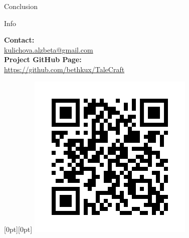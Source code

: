 \documentclass[portrait,a0paper,fontscale=0.35]{baposter}
\begin{document}
\begin{poster}
\begin{posterbox}[column=1, name=conclusion, below=result2, headerColorOne=yellow!80!orange!95!black, boxColorOne=yellow!33]{Conclusion}
\end{posterbox}


\begin{posterbox}[column=1, name=info, below=conclusion]{Info}

 


\vspace{5mm}
    \textbf{Contact:} \\
    \href{mailto:kulichova.alzbeta@gmail.com}{kulichova.alzbeta@gmail.com} \\[1ex]
    \textbf{Project GitHub Page:} \\
    \href{https://github.com/bethkux/TaleCraft}{https://github.com/bethkux/TaleCraft}\\
    



\begin{flushright}
\raisebox{10pt}[0pt][0pt]{%
\includegraphics[width=0.22\linewidth]{img/qr.png}%
}
\end{flushright}
\end{posterbox}




\end{poster}
\end{document}
